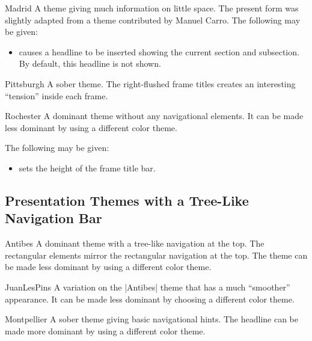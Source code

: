 \begin{themeexample}{Madrid}
  A theme giving much information on little space. The present form
  was slightly adapted from a theme contributed by Manuel Carro.
  The following  may be given:
  \begin{itemize}
  \item {} causes a headline to be inserted showing
    the current section and subsection. By default, this
    headline is not shown.
  \end{itemize}
\end{themeexample}


\begin{themeexample}{Pittsburgh}
  A sober theme. The right-flushed frame titles creates an interesting 
  ``tension'' inside each frame. 
\end{themeexample}


\begin{themeexample}{Rochester}
  A dominant theme without any navigational elements. It can be made less
  dominant by using a different color theme.

  The following  may be given:
  \begin{itemize}
  \item {} sets the height of the
    frame title bar.
  \end{itemize}
\end{themeexample}




\subsection{Presentation Themes with a Tree-Like Navigation Bar}

\begin{themeexample}{Antibes}
  A dominant theme with a tree-like navigation at the top. The 
  rectangular elements mirror the rectangular navigation at the
  top. The theme can be made less dominant by using a different color
  theme. 
\end{themeexample}

\begin{themeexample}{JuanLesPins}
  A variation on the |Antibes| theme that has a much ``smoother''
  appearance. It can be made less dominant by choosing a different
  color theme.
\end{themeexample}


\begin{themeexample}{Montpellier}
  A sober theme giving basic navigational hints. The headline can be
  made more dominant by using a different color theme.
\end{themeexample}



